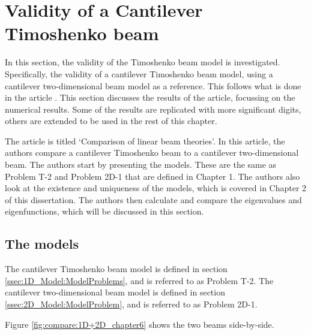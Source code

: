 \documentclass[../../main.tex]{subfiles}
\begin{document}
\section{Validity of a Cantilever Timoshenko beam} \label{sec:validity-of-a-cantilever-timoshenko-beam_chapter6}

In this section, the validity of the Timoshenko beam model is investigated. Specifically, the validity of a cantilever Timoshenko beam model, using a cantilever two-dimensional beam model as a reference. This follows what is done in the article \cite{LVV09}. This section discusses the results of the article, focussing on the numerical results. Some of the results are replicated with more significant digits, others are extended to be used in the rest of this chapter.

The article \cite{LVV09} is titled `Comparison of linear beam theories'. In this article, the authors compare a cantilever Timoshenko beam to a cantilever two-dimensional beam. The authors start by presenting the models. These are the same as Problem T-2 and Problem 2D-1 that are defined in Chapter 1. The authors also look at the existence and uniqueness of the models, which is covered in Chapter 2 of this dissertation. The authors then calculate and compare the eigenvalues and eigenfunctions, which will be discussed in this section.

\subsection{The models}
The cantilever Timoshenko beam model is defined in section \ref{ssec:1D_Model:ModelProblems}, and is referred to as Problem T-2. The cantilever two-dimensional beam model is defined in section \ref{ssec:2D_Model:ModelProblem}, and is referred to as Problem 2D-1.

Figure \ref{fig:compare:1D+2D_chapter6} shows the two beams side-by-side.
\end{document}
